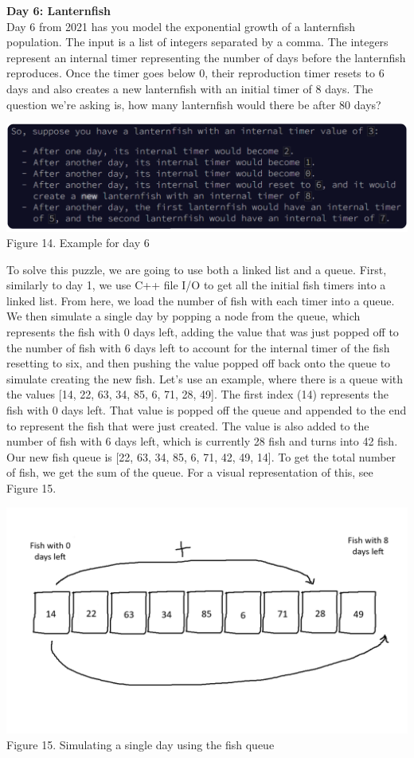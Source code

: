 \documentclass[twoside]{article}
\begin{document}
\noindent \textbf{\large Day 6: Lanternfish} \\
\noindent Day 6 from 2021 has you model the exponential growth of a lanternfish population. The input is a list of integers separated by a comma. The integers represent an internal timer representing the number of days before the lanternfish reproduces. Once the timer goes below 0, their reproduction timer resets to 6 days and also creates a new lanternfish with an initial timer of 8 days. The question we’re asking is, how many lanternfish would there be after 80 days?
\begin{center}
    \includegraphics[width=.9\textwidth]{images/day06TestInput.png}\\
    Figure 14. Example for day 6
\end{center}

\noindent To solve this puzzle, we are going to use both a linked list and a queue. First, similarly to day 1, we use C++ file I/O to get all the initial fish timers into a linked list. From here, we load the number of fish with each timer into a queue. We then simulate a single day by popping a node from the queue, which represents the fish with 0 days left, adding the value that was just popped off to the number of fish with 6 days left to account for the internal timer of the fish resetting to six, and then pushing the value popped off back onto the queue to simulate creating the new fish. Let’s use an example, where there is a queue with the values [14, 22, 63, 34, 85, 6, 71, 28, 49]. The first index (14) represents the fish with 0 days left. That value is popped off the queue and appended to the end to represent the fish that were just created. The value is also added to the number of fish with 6 days left, which is currently 28 fish and turns into 42 fish. Our new fish queue is [22, 63, 34, 85, 6, 71, 42, 49, 14]. To get the total number of fish, we get the sum of the queue. For a visual representation of this, see Figure 15.
\begin{center}
    \includegraphics[width=.8\textwidth]{images/msPaintFishQueue.png}\\
    Figure 15. Simulating a single day using the fish queue
\end{center}
\end{document}
